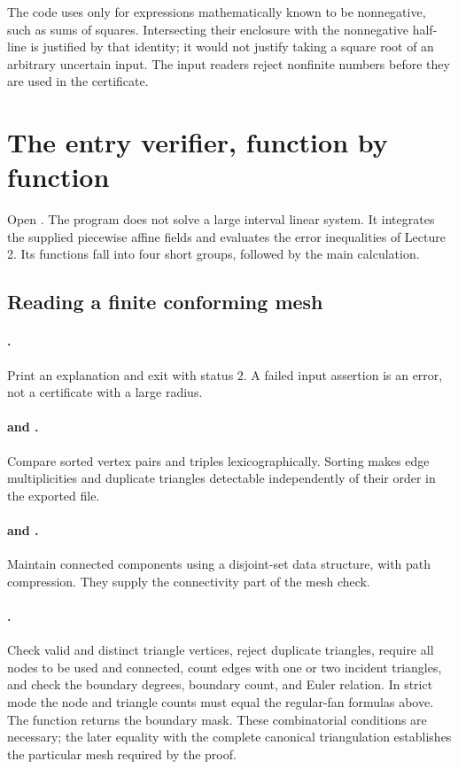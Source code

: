 The code uses  only for expressions mathematically
known to be nonnegative, such as sums of squares. Intersecting their
enclosure with the nonnegative half-line is justified by that identity;
it would not justify taking a square root of an arbitrary uncertain input.
The input readers reject nonfinite numbers before they are used in the
certificate.

\section{The entry verifier, function by function}
\label{l3:entryfunctions}
Open .
The program does not solve a large interval linear system. It integrates
the supplied piecewise affine fields and evaluates the error inequalities
of Lecture 2. Its functions fall into four short groups, followed by the
main calculation.

\subsection{Reading a finite conforming mesh}
\paragraph{.}
Print an explanation and exit with status $2$. A failed input assertion
is an error, not a certificate with a large radius.

\paragraph{ and .}
Compare sorted vertex pairs and triples lexicographically. Sorting makes
edge multiplicities and duplicate triangles detectable independently of
their order in the exported file.

\paragraph{ and .}
Maintain connected components using a disjoint-set data structure, with
path compression. They supply the connectivity part of the mesh check.

\paragraph{.}
Check valid and distinct triangle vertices, reject duplicate triangles,
require all nodes to be used and connected, count edges with one or two
incident triangles, and check the boundary degrees, boundary count, and
Euler relation. In strict mode the node and triangle counts must equal
the regular-fan formulas above. The function returns the boundary mask.
These combinatorial conditions are necessary; the later equality with
the complete canonical triangulation establishes the particular mesh
required by the proof.

